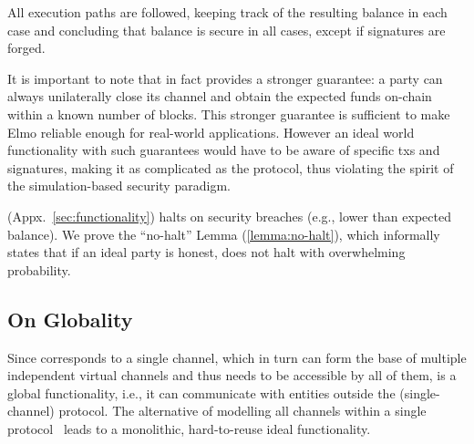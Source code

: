 \begin{proofsketch}
  All execution paths are followed, keeping track of the
  resulting balance in each case and concluding that balance is
  secure in all cases, except if signatures are forged.
\end{proofsketch}
    It is important to note that in fact \pchan provides a stronger guarantee:
  a party can always unilaterally close its channel
  and obtain the expected funds on-chain within a known number of blocks.
  This stronger guarantee is sufficient to make Elmo reliable
  enough for real-world applications. However an ideal world
  functionality with such guarantees would have to be aware of specific
  txs and signatures, making it as complicated
  as the protocol, thus violating the spirit of the simulation-based security
  paradigm.

  \fchan (Appx.~\ref{sec:functionality}) halts on security breaches (e.g., lower
  than expected balance).
  We prove the ``no-halt'' Lemma (\ref{lemma:no-halt}), which informally states
  that if an ideal party is honest, \fchan does not halt with overwhelming
  probability.

  \subsection{On Globality}
  Since \fchan corresponds to a single channel, which in turn can form the base
  of multiple independent virtual channels and thus needs to be accessible by
  all of them, \fchan is a global functionality, i.e., it can communicate with
  entities outside the (single-channel) protocol. The alternative of modelling
  all channels within a single protocol~\cite{DBLP:conf/csfw/KiayiasL20} leads
  to a monolithic, hard-to-reuse ideal functionality.

